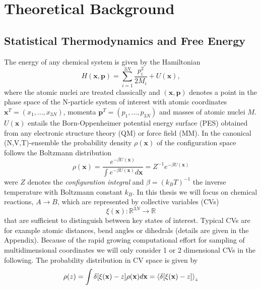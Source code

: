 \chapter{Theoretical Background}
\label{cha:theory}

\section{Statistical Thermodynamics and Free Energy}
\label{sec:freeE}

The energy of any chemical system is given by the Hamiltonian
\begin{equation}
  H(\textbf{x},\textbf{p})=\sum_{i=1}^{3N}\frac{p_{i}^{ 2}}{2 M_i} + U(\textbf{x}),
  \label{eq:lagrangian}
\end{equation}
where the atomic nuclei are treated classically and $(\textbf{x},\textbf{p})$ denotes a point in the phase space of the N-particle system of interest with atomic coordinates $\textbf{x}^T=(x_1,...,x_{3N})$, momenta $\textbf{p}^T=(p_1,...,p_{3N})$ and masses of atomic nuclei $M$.
$U(\textbf{x})$ entails the Born-Oppenheimer potential energy surface (PES) obtained from any electronic structure theory (QM) or force field (MM).
In the canonical (N,V,T)-ensemble the probability density $\rho(\textbf{x})$ of the configuration space follows the Boltzmann distribution
\begin{equation}
  \rho(\textbf{x})=\frac{e^{-\beta U(\textbf{x})}}{\int e^{-\beta U(\textbf{x})} d\textbf{x}}=Z^{-1}e^{-\beta U(\textbf{x})}
  \label{eq:boltzmann}
\end{equation}
were $Z$ denotes the \textit{configuration integral} and $\beta=(k_B T)^{-1}$ the inverse temperature with Boltzmann constant $k_B$.\autocite{chipot2007free}
In this thesis we will focus on chemical reactions, $A \longrightarrow B$, which are represented by collective variables (CVs)
\begin{equation}
 \xi(\textbf{x}) : \mathbb{R} ^{3N} \to \mathbb{R}
\end{equation}
that are sufficient to distinguish between key states of interest.
Typical CVs are for example atomic distances, bend angles or dihedrals (details are given in the Appendix).
Because of the rapid growing computational effort for sampling of multidimensional coordinates we will only consider 1 or 2 dimensional CVs in the following.
The probability distribution in CV space is given by
\begin{equation}
  \rho(z)=\int \delta[\xi(\textbf{x})-z]\rho(\textbf{x})d\textbf{x}=\braket{\delta [\xi(\textbf{x})-z]}_z
  \label{eq:rho}
\end{equation}
